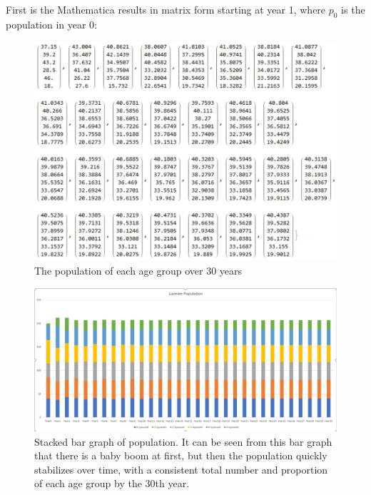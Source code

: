 \documentclass[12pt]{extarticle}
\begin{document}
First is the Mathematica results in matrix form starting at year 1, where $p_0$ is the population in year 0:
\begin{figure}[ht!]
  \includegraphics[width=\linewidth]{PopulationAfter30YearsMatrices.JPG}
  \caption{The population of each age group over 30 years}
\end{figure}
\newpage
\begin{figure}[ht!]
  \includegraphics[width=\linewidth]{PopulationGraph2.PNG}
  \caption{Stacked bar graph of population. It can be seen from this bar graph that there is a baby boom at first, but then the population quickly stabilizes over time, with a consistent total number and proportion of each age group by the 30th year. }
\end{figure}
\newpage
\end{document}
